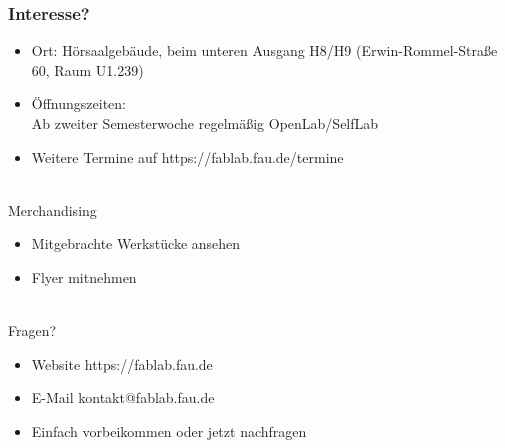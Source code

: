 \documentclass[t]{beamer}
\begin{document}
\begin{frame}
    \frametitle{Interesse?}

    \begin{itemize}
        \item Ort: Hörsaalgebäude, beim unteren Ausgang H8/H9 (Erwin-Rommel-Straße 60, Raum U1.239)
        \item Öffnungszeiten: \\Ab zweiter Semesterwoche regelmäßig OpenLab/SelfLab
        \item Weitere Termine auf {\color{blue} https://fablab.fau.de/termine}
    \end{itemize}
    ~\\
    Merchandising
    \begin{itemize}
        \item Mitgebrachte Werkstücke ansehen
        \item Flyer mitnehmen
    \end{itemize}
    ~\\
    Fragen?
    \begin{itemize}
        \item Website {\color{blue} https://fablab.fau.de}
        \item E-Mail {\color{blue} kontakt@fablab.fau.de}
        \item Einfach vorbeikommen oder jetzt nachfragen
    \end{itemize}
\end{frame}

%

\end{document}

